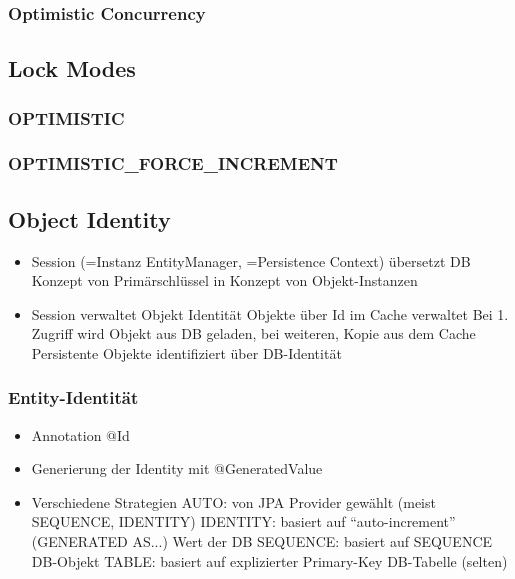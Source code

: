 \documentclass[a4paper, landscape, 8pt]{scrartcl}
\begin{document}
\begin{multicols*}{4}
        \subsubsection{Optimistic Concurrency}

        \subsection{Lock Modes}
        \subsubsection{OPTIMISTIC}
        \subsubsection{OPTIMISTIC\_FORCE\_INCREMENT}

        \subsection{Object Identity}
        \begin{itemize}
            \item Session (=Instanz EntityManager, =Persistence Context) übersetzt DB Konzept von Primärschlüssel in Konzept von Objekt-Instanzen
            \item Session verwaltet Objekt Identität
            \subitem Objekte über Id im Cache verwaltet
            \subitem Bei 1. Zugriff wird Objekt aus DB geladen, bei weiteren, Kopie aus dem Cache
            \subitem Persistente Objekte identifiziert über DB-Identität
        \end{itemize}

        \subsubsection{Entity-Identität}
        \begin{itemize}
            \item Annotation @Id
            \item Generierung der Identity mit @GeneratedValue
            \item Verschiedene Strategien
            \subitem AUTO: von JPA Provider gewählt (meist SEQUENCE, IDENTITY)
            \subitem IDENTITY: basiert auf \enquote{auto-increment} (GENERATED AS...) Wert der DB
            \subitem SEQUENCE: basiert auf SEQUENCE DB-Objekt
            \subitem TABLE: basiert auf explizierter Primary-Key DB-Tabelle (selten)
        \end{itemize}


\end{multicols*}
\end{document}
